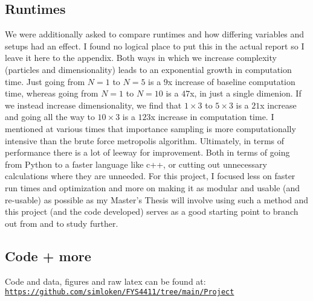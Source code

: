 \documentclass{article}
\begin{document}
\subsection{Runtimes}
We were additionally asked to compare runtimes and how differing variables and setups had an effect. I found no logical place to put this in the actual report so I leave it here to the appendix. \newline
Both ways in which we increase complexity (particles and dimensionality) leads to an exponential growth in computation time. Just going from $N=1$ to $N=5$ is a $9$x increase of baseline computation time, whereas going from $N=1$ to $N=10$ is a $47$x, in just a single dimenion. If we instead increase dimensionality, we find that $1\times3$ to $5\times 3$ is a $21$x increase and going all the way to $10\times 3$ is a $123$x increase in computation time. \newline 
I mentioned at various times that importance sampling is more computationally intensive than the brute force metropolis algorithm. \newline
Ultimately, in terms of performance there is a lot of leeway for improvement. Both in terms of going from Python to a faster language like c++, or cutting out unnecessary calculations where they are unneeded. \newpage For this project, I focused less on faster run times and optimization and more on making it as modular and usable (and re-usable) as possible as my Master's Thesis will involve using such a method and this project (and the code developed) serves as a good starting point to branch out from and to study further.
\subsection{Code + more}
Code and data, figures and raw latex can be found at: \newline \href{https://github.com/simloken/FYS4411/tree/main/Project_1}{\texttt{https://github.com/simloken/FYS4411/tree/main/Project}}
\end{document}
